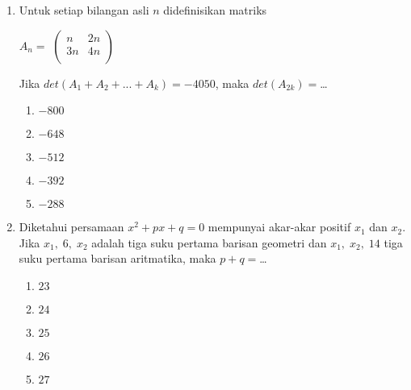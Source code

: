 \documentclass[A4,12PT, english, twocolumn]{journal}
\begin{document}
\begin{enumerate}
\item Untuk setiap bilangan asli $n$ didefinisikan matriks \begin{center}
    $A_n=$ 
    $
    \begin{pmatrix}
        n & 2n\\
        3n & 4n\\
    \end{pmatrix}
    $
\end{center}
Jika $det(A_1+A_2+...+A_k)=-4050$, maka $det(A_{2k})=$\dots
    \begin{enumerate}
        \item $-800$
        \item $-648$
        \item $-512$
        \item $-392$
        \item $-288$
    \end{enumerate}

\item Diketahui persamaan $x^2+px+q=0$ mempunyai akar-akar positif $x_1$ dan $x_2$. Jika $x_1, \; 6, \; x_2$ adalah tiga suku pertama barisan geometri dan $x_1, \; x_2, \; 14$ tiga suku pertama barisan aritmatika, maka $p+q=$\dots
    \begin{enumerate}
        \item $23$
        \item $24$
        \item $25$
        \item $26$
        \item $27$
    \end{enumerate}
    

\end{enumerate}
\end{document}
